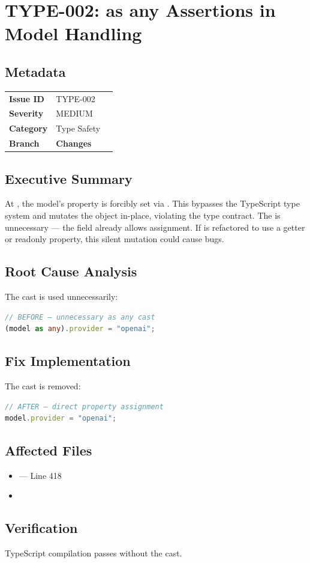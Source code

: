 \section{TYPE-002: as any Assertions in Model Handling}
\label{sec:type-002}
\subsection*{Metadata}
\begin{tabular}{ll}
\textbf{Issue ID} & TYPE-002 \\
\textbf{Severity} & MEDIUM \\
\textbf{Category} & Type Safety \\
\textbf{Branch} & 
\textbf{Changes} &  \\
\end{tabular}

\subsection*{Executive Summary}
At , the model's  property is forcibly set via . This bypasses the TypeScript type system and mutates the  object in-place, violating the type contract. The  is unnecessary — the  field already allows  assignment. If  is refactored to use a getter or readonly property, this silent mutation could cause bugs.

\subsection*{Root Cause Analysis}
The  cast is used unnecessarily:

\begin{lstlisting}[language=TypeScript]
// BEFORE — unnecessary as any cast
(model as any).provider = "openai";
\end{lstlisting}

\subsection*{Fix Implementation}
The  cast is removed:

\begin{lstlisting}[language=TypeScript]
// AFTER — direct property assignment
model.provider = "openai";
\end{lstlisting}

\subsection*{Affected Files}
\begin{itemize}
    \item {} — Line 418
    \item {}
\end{itemize}

\subsection*{Verification}
TypeScript compilation passes without the  cast.
